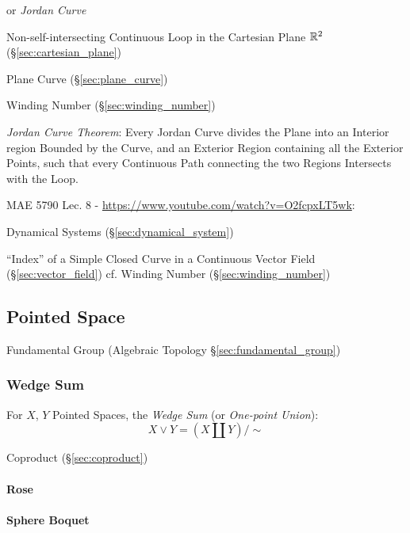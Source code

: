 or \emph{Jordan Curve}

Non-self-intersecting Continuous Loop in the Cartesian Plane $\mathbb{R}^2$
(\S\ref{sec:cartesian_plane})

\fist Plane Curve (\S\ref{sec:plane_curve})

Winding Number (\S\ref{sec:winding_number})

\emph{Jordan Curve Theorem}: Every Jordan Curve divides the Plane into an
Interior region Bounded by the Curve, and an Exterior Region containing all the
Exterior Points, such that every Continuous Path connecting the two Regions
Intersects with the Loop.


MAE 5790 Lec. 8 - \url{https://www.youtube.com/watch?v=O2fcpxLT5wk}:

\fist Dynamical Systems (\S\ref{sec:dynamical_system})

``Index'' of a Simple Closed Curve in a Continuous Vector Field
(\S\ref{sec:vector_field}) \fist cf. Winding Number
(\S\ref{sec:winding_number})



\subsection{Pointed Space}\label{sec:pointed_space}

\fist Fundamental Group (Algebraic Topology \S\ref{sec:fundamental_group})



\subsubsection{Wedge Sum}\label{sec:wedge_sum}

For $X$, $Y$ Pointed Spaces, the \emph{Wedge Sum} (or \emph{One-point
  Union}):
\[
  X \vee Y = (X \amalg Y) / \sim
\]

Coproduct (\S\ref{sec:coproduct})



\paragraph{Rose}\label{sec:rose}\hfill

\paragraph{Sphere Boquet}\label{sec:sphere_boquet}\hfill



